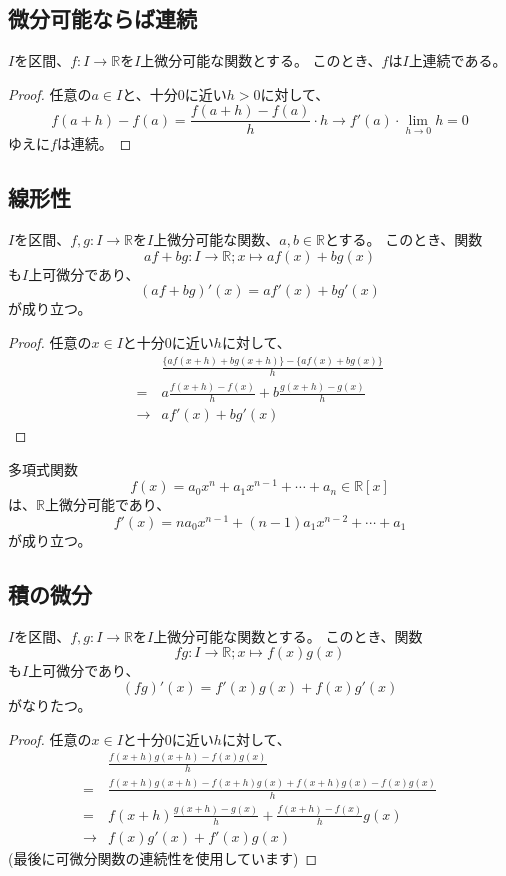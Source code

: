 \subsection{微分可能ならば連続}

\begin{theorem}
  $I$を区間、$f:I\to\mathbb{R}$を$I$上微分可能な関数とする。
  このとき、$f$は$I$上連続である。
\end{theorem}
\begin{proof}
  任意の$a\in I$と、十分0に近い$h>0$に対して、
  \[
    f(a+h)-f(a)=\frac{f(a+h)-f(a)}{h}\cdot h\to f'(a)\cdot\lim_{h\to0}h=0
  \]
  ゆえに$f$は連続。
\end{proof}

\subsection{線形性}

\begin{theorem}
  $I$を区間、$f,g:I\to\mathbb{R}$を$I$上微分可能な関数、$a,b\in\mathbb{R}$とする。
  このとき、関数
  \[
    af+bg:I\to\mathbb{R};x\mapsto af(x)+bg(x)
  \]
  も$I$上可微分であり、
  \[
    (af+bg)'(x)=af'(x)+bg'(x)
  \]
  が成り立つ。
\end{theorem}
\begin{proof}
  任意の$x\in I$と十分0に近い$h$に対して、
  \begin{align*}
    &\frac{\{af(x+h)+bg(x+h)\}-\{af(x)+bg(x)\}}{h}\\
    =&a\frac{f(x+h)-f(x)}{h}+b\frac{g(x+h)-g(x)}{h}\\
    \to&af'(x)+bg'(x)
  \end{align*}
\end{proof}

\begin{example}
  多項式関数
  \[
    f(x)=a_0x^n+a_1x^{n-1}+\cdots+a_n\in\mathbb{R}[x]
  \]
  は、$\mathbb{R}$上微分可能であり、
  \[
    f'(x)=na_0x^{n-1}+(n-1)a_1x^{n-2}+\cdots+a_1
  \]
  が成り立つ。
\end{example}

\subsection{積の微分}

\begin{theorem}
  $I$を区間、$f,g:I\to\mathbb{R}$を$I$上微分可能な関数とする。
  このとき、関数
  \[
    fg:I\to\mathbb{R};x\mapsto f(x)g(x)
  \]
  も$I$上可微分であり、
  \[
    (fg)'(x)=f'(x)g(x)+f(x)g'(x)
  \]
  がなりたつ。
\end{theorem}
\begin{proof}
  任意の$x\in I$と十分0に近い$h$に対して、
  \begin{align*}
    &\frac{f(x+h)g(x+h)-f(x)g(x)}{h}\\
    =&\frac{f(x+h)g(x+h)-f(x+h)g(x)+f(x+h)g(x)-f(x)g(x)}{h}\\
    =&f(x+h)\frac{g(x+h)-g(x)}{h}+\frac{f(x+h)-f(x)}{h}g(x)\\
    \to&f(x)g'(x)+f'(x)g(x)
  \end{align*}
  (最後に可微分関数の連続性を使用しています)
\end{proof}

